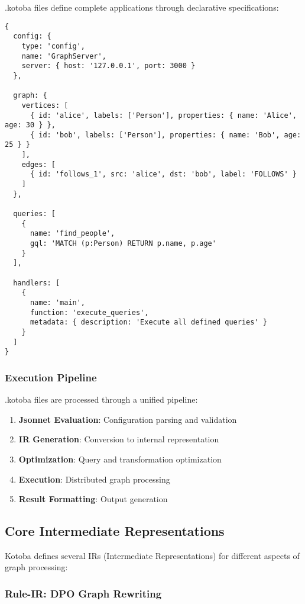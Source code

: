 \documentclass[11pt,a4paper]{article}
\begin{document}
.kotoba files define complete applications through declarative specifications:

\begin{lstlisting}[language=jsonnet,caption=Example .kotoba file for HTTP server]
{
  config: {
    type: 'config',
    name: 'GraphServer',
    server: { host: '127.0.0.1', port: 3000 }
  },

  graph: {
    vertices: [
      { id: 'alice', labels: ['Person'], properties: { name: 'Alice', age: 30 } },
      { id: 'bob', labels: ['Person'], properties: { name: 'Bob', age: 25 } }
    ],
    edges: [
      { id: 'follows_1', src: 'alice', dst: 'bob', label: 'FOLLOWS' }
    ]
  },

  queries: [
    {
      name: 'find_people',
      gql: 'MATCH (p:Person) RETURN p.name, p.age'
    }
  ],

  handlers: [
    {
      name: 'main',
      function: 'execute_queries',
      metadata: { description: 'Execute all defined queries' }
    }
  ]
}
\end{lstlisting}

\subsubsection{Execution Pipeline}
\label{subsubsec:execution_pipeline}

.kotoba files are processed through a unified pipeline:

\begin{enumerate}
\item \textbf{Jsonnet Evaluation}: Configuration parsing and validation
\item \textbf{IR Generation}: Conversion to internal representation
\item \textbf{Optimization}: Query and transformation optimization
\item \textbf{Execution}: Distributed graph processing
\item \textbf{Result Formatting}: Output generation
\end{enumerate}

\subsection{Core Intermediate Representations}
\label{subsec:ir_design}

Kotoba defines several IRs (Intermediate Representations) for different aspects of graph processing:

\subsubsection{Rule-IR: DPO Graph Rewriting}
\label{subsubsec:rule_ir}
\end{document}
